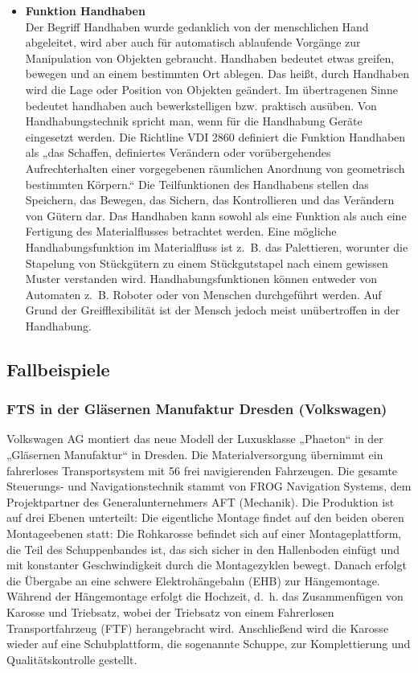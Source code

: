 \begin{itemize}
\begin{itemize}
\item \textbf{Funktion Handhaben } \\
Der Begriff Handhaben wurde gedanklich von der menschlichen Hand abgeleitet, wird aber auch f\"ur automatisch ablaufende Vorg\"ange zur Manipulation von Objekten gebraucht.
Handhaben bedeutet etwas greifen, bewegen und an einem bestimmten Ort ablegen.
Das hei\ss t, durch Handhaben wird die Lage oder Position von Objekten ge\"andert.
Im \"ubertragenen Sinne bedeutet handhaben auch bewerkstelligen bzw. praktisch aus\"uben.
Von Handhabungstechnik spricht man, wenn f\"ur die Handhabung Ger\"ate eingesetzt werden.
Die Richtline VDI 2860 definiert die Funktion Handhaben als „das Schaffen, definiertes Ver\"andern oder vor\"ubergehendes Aufrechterhalten einer vorgegebenen r\"aumlichen Anordnung von geometrisch bestimmten K\"orpern.“
Die Teilfunktionen des Handhabens stellen das Speichern, das Bewegen, das Sichern, das Kontrollieren und das Ver\"andern von G\"utern dar.
Das Handhaben kann sowohl als eine Funktion als auch eine Fertigung des Materialflusses betrachtet werden.
Eine m\"ogliche Handhabungsfunktion im Materialfluss ist z.~B. das Palettieren, worunter die Stapelung von St\"uckg\"utern zu einem St\"uckgutstapel nach einem gewissen Muster verstanden wird.
Handhabungsfunktionen k\"onnen entweder von Automaten z.~B. Roboter oder von Menschen durchgef\"uhrt werden.
Auf Grund der Greifflexibilit\"at ist der Mensch jedoch meist un\"ubertroffen in der Handhabung.
\end{itemize}

\subsection{Fallbeispiele}
\subsubsection{FTS in der Gl\"asernen Manufaktur Dresden (Volkswagen)}
Volkswagen AG montiert das neue Modell der Luxusklasse „Phaeton“ in der „Gl\"asernen Manufaktur“ in Dresden.
Die Materialversorgung \"ubernimmt ein fahrerloses Transportsystem mit 56 frei navigierenden Fahrzeugen.
Die gesamte Steuerungs- und Navigationstechnik stammt von FROG Navigation Systems, dem Projektpartner des Generalunternehmers AFT (Mechanik).
Die Produktion ist auf drei Ebenen unterteilt:
Die eigentliche Montage findet auf den beiden oberen Montageebenen statt:
Die Rohkarosse befindet sich auf einer Montageplattform, die Teil des Schuppenbandes ist, das sich sicher in den Hallenboden einf\"ugt und mit konstanter Geschwindigkeit durch die Montagezyklen bewegt.
Danach erfolgt die \"Ubergabe an eine schwere Elektroh\"angebahn (EHB) zur H\"angemontage.
W\"ahrend der H\"angemontage erfolgt die Hochzeit, d.~h. das Zusammenf\"ugen von Karosse und Triebsatz, wobei der Triebsatz von einem Fahrerlosen Transportfahrzeug (FTF) herangebracht wird.
Anschlie\ss end wird die Karosse wieder auf eine Schubplattform, die sogenannte Schuppe, zur Komplettierung und Qualit\"atskontrolle gestellt.


\end{itemize}
